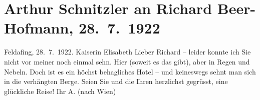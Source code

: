 

               \section[Arthur Schnitzler an Richard Beer-Hofmann, 28. 7. 1922]{ Arthur Schnitzler an Richard Beer-Hofmann, 28. 7. 1922}\nopagebreak{}\rehead{ }\begin{ledgroupsized}[t]{13cm}\normalsize\beginnumbering{} \toendnotes[C]{\smallbreak\pagebreak[2]} 
\toendnotes[C]{\smallbreak}\pstart
           \raggedleft{}{\pb}Feldafing, 28. 7. 1922.\pend
           \pstart
           \raggedleft{}Kaiserin Elisabeth\pend
           \pstart
           Lieber Richard – leider konnte ich Sie nicht vor meiner \label{K_L02554-2v}\label{K_L02554-2h} noch einmal sehn. Hier \label{K_L02554-1v}\label{K_L02554-1h} (soweit es das gibt), aber in Regen und Nebeln. Doch ist es ein höchst
               behagliches Hotel – und
               keineswegs sehnt man sich in die verhängten Berge. Seien Sie und die Ihren herzlichst
               gegrüsst, eine glückliche Reise! Ihr \spacefill\mbox{A.}\pend
           \pstart
           \noindent{}(nach Wien)\pend
                     \endnumbering{}\end{ledgroupsized}  \newcommand{\dateiname}{L02554}\newcommand{\titel}{Arthur Schnitzler an Richard Beer-Hofmann, 28. 7. 1922}\newcommand{\editorInnen}{Martin Anton Müller und Gerd-Hermann Susen}
            \footnotesize
\begin{ledgroupsized}[t]{11.5cm}
\end{ledgroupsized}
         
      